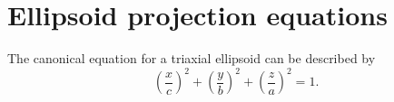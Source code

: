 \documentclass[amt, manuscript]{copernicus}
\begin{document}












\appendix
\section{Ellipsoid projection equations}\label{appen:A}   %


The canonical equation for a triaxial ellipsoid can be described by
\begin{equation}\label{d}
    \left(\frac{x}{c}\right)^{2} + \left(\frac{y}{b}\right)^{2} + \left( \frac{z}{a}\right)^{2} = 1. 
\end{equation}
\end{document}

